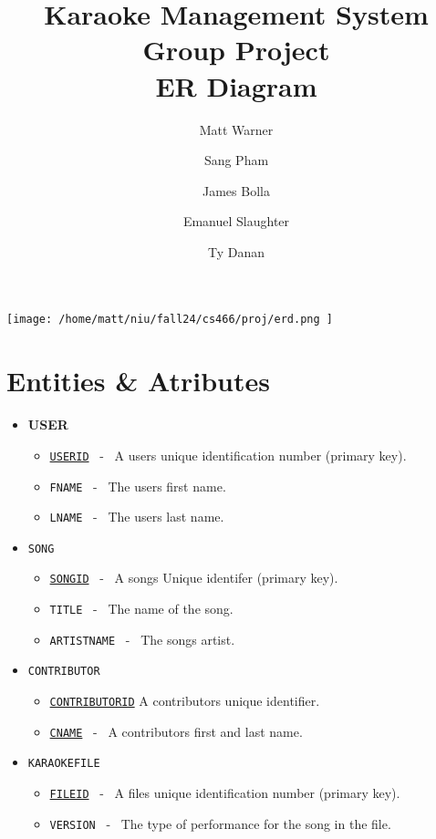 \documentclass{report}
\title{\Huge\textbf{Karaoke Management System Group Project}\\[1em] 
\Huge ER Diagram}
\author{
    \Large Matt Warner \and
    \Large Sang Pham \and
    \Large James Bolla \and
    \Large Emanuel Slaughter \and
    \Large Ty Danan
}
\date{\huge{}}
\begin{document}
    \maketitle
    \begin{center}
    \vspace*{\fill}
\texttt{[image:  /home/matt/niu/fall24/cs466/proj/erd.png ]}
\vspace*{\fill}
    \end{center}
\newpage
\section{Entities \& Atributes}
\begin{itemize}
    \item \textbf{USER}
        \begin{itemize}[label=$\circ$]
            \item \texttt{\underline{USERID}} \ - \ A users unique identification number (primary key).
            \item \texttt{FNAME} \ - \ The users first name.
            \item \texttt{LNAME} \ - \ The users last name.
        \end{itemize}
    \item \texttt{SONG} 
        \begin{itemize}[label=$\circ$]
            \item \texttt{\underline{SONGID}} \ - \ A songs Unique identifer (primary key).
            \item \texttt{TITLE} \ - \ The name of the song.
            \item \texttt{ARTISTNAME} \ - \ The songs artist.
        \end{itemize}
    \item \texttt{CONTRIBUTOR}
        \begin{itemize}[label=$\circ$]
            \item \texttt{\underline{CONTRIBUTORID}} A contributors unique identifier.
            \item \texttt{\underline{CNAME}} \ - \ A contributors first and last name.
        \end{itemize}
        \item \texttt{KARAOKEFILE}
        \begin{itemize}[label=$\circ$]
            \item \texttt{\underline{FILEID}} \ - \  A files unique identification number (primary key).
            \item \texttt{VERSION} \ - \ The type of performance for the song in the file.
        \end{itemize}
\end{itemize}
\end{document}
